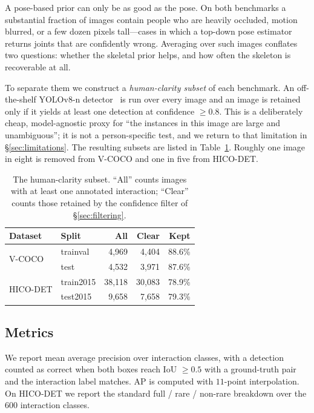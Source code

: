 \documentclass[12pt,a4paper]{article}
\begin{document}
A pose-based prior can only be as good as the pose. On both benchmarks a
substantial fraction of images contain people who are heavily occluded, motion
blurred, or a few dozen pixels tall---cases in which a top-down pose estimator
returns joints that are confidently wrong. Averaging over such images conflates
two questions: whether the skeletal prior helps, and how often the skeleton is
recoverable at all.

To separate them we construct a \emph{human-clarity subset} of each benchmark.
An off-the-shelf YOLOv8-n detector~\cite{yolov8} is run over every image and an
image is retained only if it yields at least one detection at confidence
$\geq 0.8$. This is a deliberately cheap, model-agnostic proxy for ``the
instances in this image are large and unambiguous''; it is not a person-specific
test, and we return to that limitation in \S\ref{sec:limitations}. The
resulting subsets are listed in Table~\ref{tab:data}. Roughly one image in eight
is removed from V-COCO and one in five from HICO-DET.

\begin{table}[t]
\centering\small
\caption{The human-clarity subset. ``All'' counts images with at least one
annotated interaction; ``Clear'' counts those retained by the confidence filter
of \S\ref{sec:filtering}.}
\label{tab:data}
\setlength{\tabcolsep}{4pt}
\begin{tabular}{llrrr}
\toprule
Dataset & Split & All & Clear & Kept \\
\midrule
\multirow{2}{*}{V-COCO}
  & trainval  & 4{,}969  & 4{,}404  & 88.6\% \\
  & test      & 4{,}532  & 3{,}971  & 87.6\% \\
\midrule
\multirow{2}{*}{HICO-DET}
  & train2015 & 38{,}118 & 30{,}083 & 78.9\% \\
  & test2015  & \phantom{0}9{,}658  & \phantom{0}7{,}658  & 79.3\% \\
\bottomrule
\end{tabular}
\end{table}

\subsection{Metrics}
We report mean average precision over interaction classes, with a detection
counted as correct when both boxes reach IoU $\geq 0.5$ with a ground-truth pair
and the interaction label matches. AP is computed with $11$-point interpolation.
On HICO-DET we report the standard full / rare / non-rare breakdown over the
$600$ interaction classes.
\end{document}

